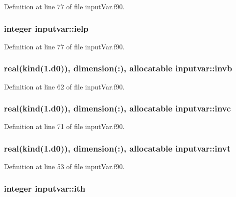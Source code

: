 Definition at line 77 of file input\-Var.\-f90.

\hypertarget{classinputvar_a0190bc42c3dad91d811c585952ff55f4}{
\subsubsection[{ielp}]{\setlength{\rightskip}{0pt plus 5cm}integer inputvar\-::ielp}}\label{classinputvar_a0190bc42c3dad91d811c585952ff55f4}


Definition at line 77 of file input\-Var.\-f90.

\hypertarget{classinputvar_a9720dc92330c2ac44a2ade71319efdfc}{
\subsubsection[{invb}]{\setlength{\rightskip}{0pt plus 5cm}real(kind(1.d0)), dimension(\-:), allocatable inputvar\-::invb}}\label{classinputvar_a9720dc92330c2ac44a2ade71319efdfc}


Definition at line 62 of file input\-Var.\-f90.

\hypertarget{classinputvar_ad241283eadb6335a2d955ba6d30cffb6}{
\subsubsection[{invc}]{\setlength{\rightskip}{0pt plus 5cm}real(kind(1.d0)), dimension(\-:), allocatable inputvar\-::invc}}\label{classinputvar_ad241283eadb6335a2d955ba6d30cffb6}


Definition at line 71 of file input\-Var.\-f90.

\hypertarget{classinputvar_abe7ea839b7f1cd20925aa7e709396529}{
\subsubsection[{invt}]{\setlength{\rightskip}{0pt plus 5cm}real(kind(1.d0)), dimension(\-:), allocatable inputvar\-::invt}}\label{classinputvar_abe7ea839b7f1cd20925aa7e709396529}


Definition at line 53 of file input\-Var.\-f90.

\hypertarget{classinputvar_a4bba5fd8a8c399940c4b81e4da0cc9ce}{
\subsubsection[{ith}]{\setlength{\rightskip}{0pt plus 5cm}integer inputvar\-::ith}}\label{classinputvar_a4bba5fd8a8c399940c4b81e4da0cc9ce}


